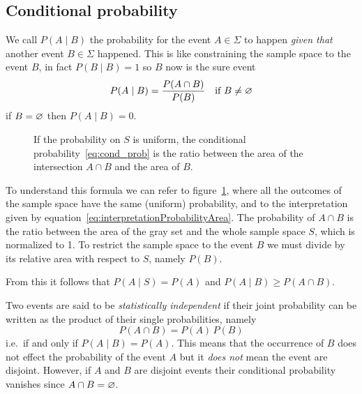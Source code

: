 \subsection{Conditional probability}
\label{sec:condProb}

We call $P(A\mid B)$ the probability for the event $A\in\Sigma$ to happen \emph{given that} another event $B\in\Sigma$ happened.
This is like constraining the sample space to the event $B$, in fact $P(B\mid B) = 1$ so $B$ now is the sure event
\begin{equation}\label{eq:cond_prob}
	P(A\mid B) =\frac{P(A\cap B)}{P(B)}\quad\text{if } B\neq \varnothing
\end{equation}
if $B = \varnothing$ then $P(A\mid B) = 0$.
\begin{figure}
	\centering
	\begin{venndiagram2sets}[%
			labelNotAB={$S$}
		]
		\fillACapB
	\end{venndiagram2sets}
	\caption{If the probability on $S$ is uniform, the conditional probability~\eqref{eq:cond_prob} is the ratio between the area of the intersection $A\cap B$ and the area of $B$.}
	\label{fig:cond_prob}
\end{figure}
To understand this formula we can refer to figure~\ref{fig:cond_prob}, where all the outcomes of the sample space have the same (uniform) probability, and to the interpretation given by equation~\eqref{eq:interpretationProbabilityArea}.
The probability of $A \cap B$ is the ratio between the area of the gray set and the whole sample space $S$, which is normalized to \num{1}.
To restrict the sample space to the event $B$ we must divide by its relative area with respect to $S$, namely $P(B)$.


From this it follows that $P(A\mid S) = P(A)$ and $P(A\mid B) \ge P(A\cap B)$.




Two events are said to be \emph{statistically independent} if their joint probability can be written as the product of their single probabilities, namely
\begin{equation}
	P(A\cap B) = P(A)\,P(B)
\end{equation}
i.e.~if and only if $P(A\mid B) = P(A)$.
This means that the occurrence of $B$ does not effect the probability of the event $A$ but it \emph{does not} mean the event are disjoint.
However, if $A$ and $B$ are disjoint events their conditional probability vanishes since $A\cap B = \varnothing$.

